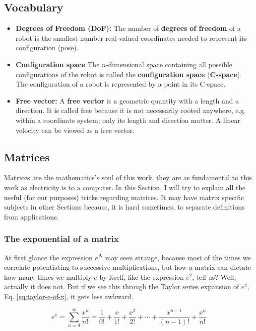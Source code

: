 \documentclass[12pt]{article}
\begin{document}
\subsection{Vocabulary}
\begin{itemize}
    \item \textbf{Degrees of Freedom (DoF):} The number of \textbf{degrees of freedom} of a robot is the smallest number real-valued coordinates needed to represent its configuration \cite{lynch2017modern} (pose).
    \item{\textbf{Configuration space}} The $n$-dimensional space containing all possible configurations of the robot is called the \textbf{configuration space} (\textbf{C-space}). The configuration of a robot is represented by a point in its C-space. \cite{lynch2017modern}
    \item{\textbf{Free vector:} A \textbf{free vector} is a geometric quantity with a length and a direction. It is called free because it is not necessarily rooted anywhere, e.g. within a coordinate system; only its length and direction matter. A linear velocity can be viewed as a free vector.}
\end{itemize}

\subsection{Matrices}
Matrices are the mathematics's soul of this work, they are as fundamental to this work as electricity is to a computer. In this Section, I will try to explain all the useful (for our purposes) tricks regarding matrices. It may have matrix specific subjects in other Sections because, it is hard sometimes, to separate definitions from applications.

\subsubsection{The exponential of a matrix}
At first glance the expression $e^{\mathbf{A}}$ may seen strange, because most of the times we correlate potentiating to successive multiplications, but how a matrix can dictate how many times we multiply $e$ by itself, like the expression $e^2$, tell us? Well, actually it does not. But if we see this through the Taylor series expansion of $e^x$, Eq. \ref{eq:taylor-e-of-x}, it gets less awkward.

\begin{equation}
    e^x = \sum_{n = 0}^{\infty}{\frac{x^n}{n!}} = \frac{1}{0!} + \frac{x}{1!} + \frac{x^2}{2!} + \cdots + \frac{x^{n-1}}{(n-1)!} + \frac{x^n}{n!}
\label{eq:taylor-e-of-x}
\end{equation}
\end{document}
